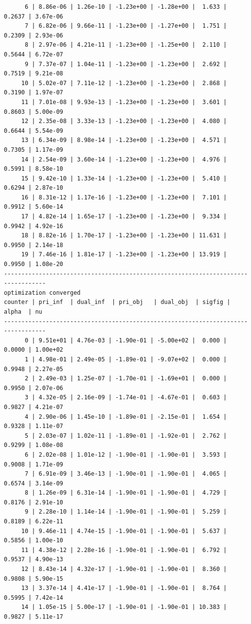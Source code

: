 \documentclass[
]{book}
\begin{document}
\begin{verbatim}
      6 | 8.86e-06 | 1.26e-10 | -1.23e+00 | -1.28e+00 |  1.633 | 0.2637 | 3.67e-06
      7 | 6.82e-06 | 9.66e-11 | -1.23e+00 | -1.27e+00 |  1.751 | 0.2309 | 2.93e-06
      8 | 2.97e-06 | 4.21e-11 | -1.23e+00 | -1.25e+00 |  2.110 | 0.5644 | 6.72e-07
      9 | 7.37e-07 | 1.04e-11 | -1.23e+00 | -1.23e+00 |  2.692 | 0.7519 | 9.21e-08
     10 | 5.02e-07 | 7.11e-12 | -1.23e+00 | -1.23e+00 |  2.868 | 0.3190 | 1.97e-07
     11 | 7.01e-08 | 9.93e-13 | -1.23e+00 | -1.23e+00 |  3.601 | 0.8603 | 5.00e-09
     12 | 2.35e-08 | 3.33e-13 | -1.23e+00 | -1.23e+00 |  4.080 | 0.6644 | 5.54e-09
     13 | 6.34e-09 | 8.98e-14 | -1.23e+00 | -1.23e+00 |  4.571 | 0.7305 | 1.17e-09
     14 | 2.54e-09 | 3.60e-14 | -1.23e+00 | -1.23e+00 |  4.976 | 0.5991 | 8.58e-10
     15 | 9.42e-10 | 1.33e-14 | -1.23e+00 | -1.23e+00 |  5.410 | 0.6294 | 2.87e-10
     16 | 8.31e-12 | 1.17e-16 | -1.23e+00 | -1.23e+00 |  7.101 | 0.9912 | 5.60e-14
     17 | 4.82e-14 | 1.65e-17 | -1.23e+00 | -1.23e+00 |  9.334 | 0.9942 | 4.92e-16
     18 | 8.82e-16 | 1.70e-17 | -1.23e+00 | -1.23e+00 | 11.631 | 0.9950 | 2.14e-18
     19 | 7.46e-16 | 1.81e-17 | -1.23e+00 | -1.23e+00 | 13.919 | 0.9950 | 1.08e-20
----------------------------------------------------------------------------------
optimization converged
counter | pri_inf  | dual_inf  | pri_obj   | dual_obj  | sigfig | alpha  | nu 
----------------------------------------------------------------------------------
      0 | 9.51e+01 | 4.76e-03 | -1.90e-01 | -5.00e+02 |  0.000 | 0.0000 | 1.00e+02
      1 | 4.98e-01 | 2.49e-05 | -1.89e-01 | -9.07e+02 |  0.000 | 0.9948 | 2.27e-05
      2 | 2.49e-03 | 1.25e-07 | -1.70e-01 | -1.69e+01 |  0.000 | 0.9950 | 2.07e-06
      3 | 4.32e-05 | 2.16e-09 | -1.74e-01 | -4.67e-01 |  0.603 | 0.9827 | 4.21e-07
      4 | 2.90e-06 | 1.45e-10 | -1.89e-01 | -2.15e-01 |  1.654 | 0.9328 | 1.11e-07
      5 | 2.03e-07 | 1.02e-11 | -1.89e-01 | -1.92e-01 |  2.762 | 0.9299 | 1.08e-08
      6 | 2.02e-08 | 1.01e-12 | -1.90e-01 | -1.90e-01 |  3.593 | 0.9008 | 1.71e-09
      7 | 6.91e-09 | 3.46e-13 | -1.90e-01 | -1.90e-01 |  4.065 | 0.6574 | 3.14e-09
      8 | 1.26e-09 | 6.31e-14 | -1.90e-01 | -1.90e-01 |  4.729 | 0.8176 | 2.91e-10
      9 | 2.28e-10 | 1.14e-14 | -1.90e-01 | -1.90e-01 |  5.259 | 0.8189 | 6.22e-11
     10 | 9.46e-11 | 4.74e-15 | -1.90e-01 | -1.90e-01 |  5.637 | 0.5856 | 1.00e-10
     11 | 4.38e-12 | 2.28e-16 | -1.90e-01 | -1.90e-01 |  6.792 | 0.9537 | 4.90e-13
     12 | 8.43e-14 | 4.32e-17 | -1.90e-01 | -1.90e-01 |  8.360 | 0.9808 | 5.90e-15
     13 | 3.37e-14 | 4.41e-17 | -1.90e-01 | -1.90e-01 |  8.764 | 0.5995 | 7.42e-14
     14 | 1.05e-15 | 5.00e-17 | -1.90e-01 | -1.90e-01 | 10.383 | 0.9827 | 5.11e-17

\end{verbatim}
\end{document}
